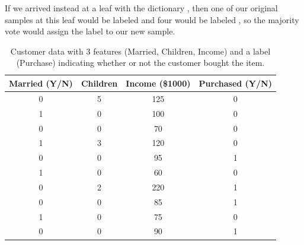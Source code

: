 If we arrived instead at a leaf with the dictionary , then one of our original samples at this leaf would be labeled  and four would be labeled , so the majority vote would assign the label  to our new sample.

\begin{table}[H]
\begin{center}
\begin{tabular}{c|c|c|c}
Married (Y/N) & Children & Income (\$1000) & Purchased (Y/N) \\ \hline
0 & 5 & 125 & 0 \\
1 & 0 & 100 & 0 \\
0 & 0 & 70 & 0 \\
1 & 3 & 120 & 0 \\
0 & 0 & 95 & 1 \\
1 & 0 & 60 & 0 \\
0 & 2 & 220 & 1 \\
0 & 0 & 85 & 1 \\
1 & 0 & 75 & 0 \\
0 & 0 & 90 & 1
\end{tabular}
\caption{Customer data with 3 features (Married, Children, Income) and a label (Purchase) indicating whether or not the customer bought the item.}
\label{table:customer-data}
\end{center}
\end{table}

